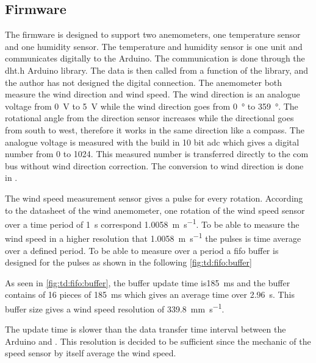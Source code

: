 \subsection{Firmware}
The firmware is designed to support two anemometers, one temperature sensor and one humidity sensor.
The temperature and humidity sensor is one unit and communicates digitally to the Arduino. The communication is done through the dht.h Arduino library. The data is then called from a function of the library, and the author has not designed the digital connection. 
The anemometer both measure the wind direction and wind speed. The wind direction is an analogue voltage from \SI{0}{\volt} to \SI{5}{\volt} while the wind direction goes from \SI{0}{\degree} to \SI{359}{\degree}. The rotational angle from the direction sensor increases while the directional goes from south to west, therefore it works in the same direction like a compass. The analogue voltage is measured with the build in 10 bit \gls{adc} which gives a digital number from 0 to 1024. This measured number is transferred directly to the com bus without wind direction correction. The conversion to wind direction is done in \matlab. 

The wind speed measurement sensor gives a pulse for every rotation. According to the datasheet of the wind anemometer, one rotation of the wind speed sensor over a time period of \SI{1}{\second} correspond \SI{1.0058}{\meter\per\second}. To be able to measure the wind speed in a higher resolution that \SI{1.0058}{\meter\per\second} the pulses is time average over a defined period. To be able to measure over a period a \gls{fifo} buffer is designed for the pulses as shown in the following \autoref{fig:td:fifo:buffer} 

As seen in \autoref{fig:td:fifo:buffer}, the buffer update time is\SI{185}{\milli\second} and the buffer contains of 16 pieces of \SI{185}{\milli\second} which gives an average time over \SI{2.96}{\second}. This buffer size gives a wind speed resolution of \SI{339.8}{\milli\meter\per\second}. 

The update time is slower than the data transfer time interval between the Arduino and \matlab.  This resolution is decided to be sufficient since the mechanic of the speed sensor by itself average the wind speed.

